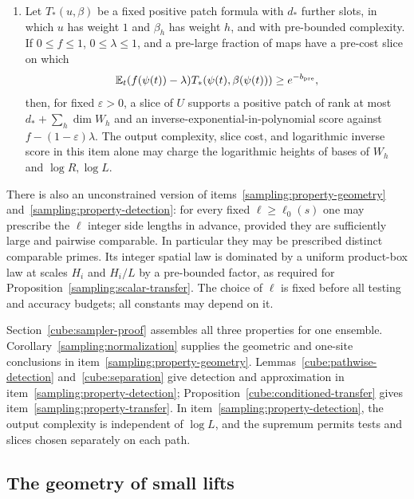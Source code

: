 \begin{proposition}
\begin{enumerate}
\item\label{sampling:property-transfer}
Let $T_*(u,\beta)$ be a fixed positive patch formula with $d_*$
further slots, in which $u$ has weight $1$ and $\beta_h$ has weight $h$,
and with pre-bounded complexity.  If $0\le f\le1$, $0\le\lambda\le1$,
and a pre-large fraction of maps have a pre-cost slice on which
\[
 \mathbb E_t(f(\psi(t))-\lambda)
 T_*(\psi(t),\beta(\psi(t)))\ge e^{-b_{\mathrm{pre}}},
\]
then, for fixed $\varepsilon>0$, a slice of $U$ supports a positive patch
of rank at most $d_*+\sum_h\dim W_h$ and an inverse-exponential-in-polynomial
score against $f-(1-\varepsilon)\lambda$.
The output complexity, slice cost, and logarithmic inverse score in this
item alone may charge the
logarithmic heights of bases of $W_h$ and $\log R,\log L$.
\end{enumerate}
There is also an unconstrained version of
items~\ref{sampling:property-geometry} and~\ref{sampling:property-detection}:
for every fixed
$\ell\ge\ell_0(s)$ one may prescribe the $\ell$ integer side lengths
in advance, provided they are sufficiently large and pairwise comparable.
In particular they may be prescribed distinct comparable primes.  Its
integer spatial law is dominated by a uniform product-box law at scales
$H_i$ and $H_i/L$ by a pre-bounded factor, as required for
Proposition~\ref{sampling:scalar-transfer}.  The choice of $\ell$ is fixed
before all testing and accuracy budgets; all constants may depend on it.
\end{proposition}

\begin{remark}
Section~\ref{cube:sampler-proof} assembles all three properties for one
ensemble.
Corollary~\ref{sampling:normalization} supplies the geometric and one-site
conclusions in item~\ref{sampling:property-geometry}.
Lemmas~\ref{cube:pathwise-detection} and~\ref{cube:separation} give
detection and approximation in item~\ref{sampling:property-detection};
Proposition~\ref{cube:conditioned-transfer} gives
item~\ref{sampling:property-transfer}.  In
item~\ref{sampling:property-detection}, the output complexity is independent
of $\log L$, and the supremum permits tests and slices chosen separately
on each path.
\end{remark}

\subsection{The geometry of small lifts}

